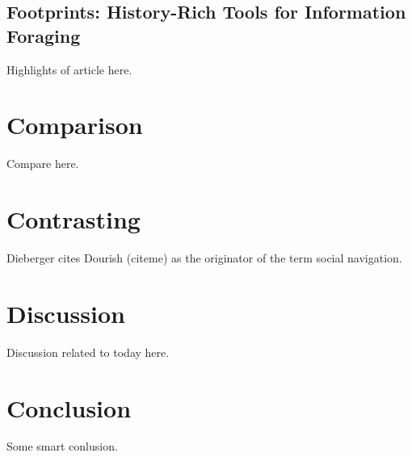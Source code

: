 \documentclass[12pt,a4paper]{article}
\begin{document}
\subsection{Footprints: History-Rich Tools for Information Foraging}

Highlights of article here.

\section{Comparison}

Compare here.

\section{Contrasting}

Dieberger cites Dourish (citeme) as the originator of the term social
navigation.

\section{Discussion}

Discussion related to today here.

\section{Conclusion}

Some smart conlusion.

\section{}




\end{document}
